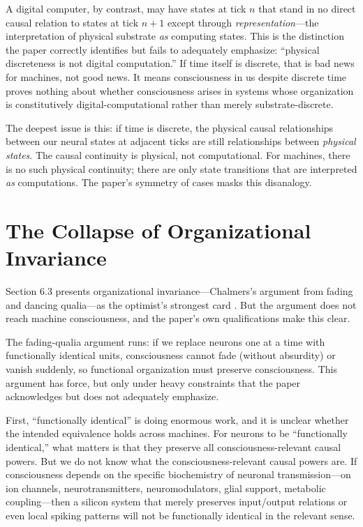 \documentclass[11pt]{article}
\begin{document}
A digital computer, by contrast, may have states at tick $n$ that stand in no direct causal relation to states at tick $n+1$ except through \textit{representation}---the interpretation of physical substrate \textit{as} computing states. This is the distinction the paper correctly identifies but fails to adequately emphasize: ``physical discreteness is not digital computation.'' If time itself is discrete, that is bad news for machines, not good news. It means consciousness in us despite discrete time proves nothing about whether consciousness arises in systems whose organization is constitutively digital-computational rather than merely substrate-discrete.

The deepest issue is this: if time is discrete, the physical causal relationships between our neural states at adjacent ticks are still relationships between \textit{physical states}. The causal continuity is physical, not computational. For machines, there is no such physical continuity; there are only state transitions that are interpreted \textit{as} computations. The paper's symmetry of cases masks this disanalogy.

\section{The Collapse of Organizational Invariance}

Section 6.3 presents organizational invariance---Chalmers's argument from fading and dancing qualia---as the optimist's strongest card \citep{chalmers1996}. But the argument does not reach machine consciousness, and the paper's own qualifications make this clear.

The fading-qualia argument runs: if we replace neurons one at a time with functionally identical units, consciousness cannot fade (without absurdity) or vanish suddenly, so functional organization must preserve consciousness. This argument has force, but only under heavy constraints that the paper acknowledges but does not adequately emphasize.

First, ``functionally identical'' is doing enormous work, and it is unclear whether the intended equivalence holds across machines. For neurons to be ``functionally identical,'' what matters is that they preserve all consciousness-relevant causal powers. But we do not know what the consciousness-relevant causal powers are. If consciousness depends on the specific biochemistry of neuronal transmission---on ion channels, neurotransmitters, neuromodulators, glial support, metabolic coupling---then a silicon system that merely preserves input/output relations or even local spiking patterns will not be functionally identical in the relevant sense.
\end{document}
